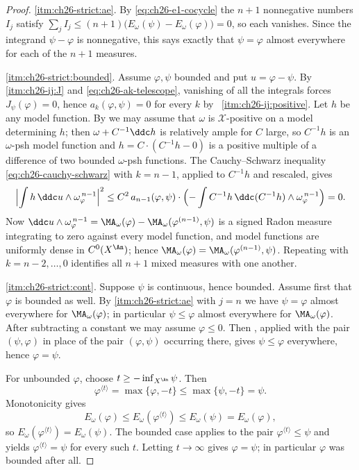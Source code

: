 \begin{proof}
\cref{itm:ch26-strict:ae}.  By \eqref{eq:ch26-e1-cocycle} the \(n+1\)
nonnegative numbers \(I_j\) satisfy
\(\sum_jI_j\leq(n+1)\bigl(E_\omega(\psi)-E_\omega(\varphi)\bigr)=0\), so each
vanishes.  Since the integrand \(\psi-\varphi\) is nonnegative, this says
exactly that \(\psi=\varphi\) almost everywhere for each of the \(n+1\)
measures.

\cref{itm:ch26-strict:bounded}.  Assume \(\varphi,\psi\) bounded and put
\(u=\varphi-\psi\).  By \,%
\cref{itm:ch26-ij:J} and \eqref{eq:ch26-ak-telescope}, vanishing of all the
integrals forces \(J_\psi(\varphi)=0\), hence \(a_k(\varphi,\psi)=0\) for
every \(k\) by \,%
\cref{itm:ch26-ij:positive}.  Let \(h\) be any model function.  By
 we may assume that \(\omega\) is
\(\mathcal X\)-positive on a model determining \(h\); then
\(\omega+C^{-1}\ddc h\) is relatively ample for \(C\) large, so \(C^{-1}h\)
is an \(\omega\)-psh model function and \(h=C\cdot(C^{-1}h-0)\) is a positive
multiple of a difference of two bounded \(\omega\)-psh functions.  The
Cauchy--Schwarz inequality \eqref{eq:ch26-cauchy-schwarz} with \(k=n-1\),
applied to \(C^{-1}h\) and rescaled, gives
\[
 \Bigl|\int h\,\ddc u\wedge\omega_\varphi^{\,n-1}\Bigr|^2
 \leq C^2\,a_{n-1}(\varphi,\psi)\cdot
  \Bigl(-\int C^{-1}h\,\ddc(C^{-1}h)\wedge\omega_\varphi^{\,n-1}\Bigr)=0 .
\]
Now \(\ddc u\wedge\omega_\varphi^{\,n-1}
=\MA_\omega(\varphi)-\MA_\omega(\varphi^{(n-1)},\psi)\) is a signed Radon
measure integrating to zero against every model function, and model functions
are uniformly dense in \(C^0(X^{\An})\); hence
\(\MA_\omega(\varphi)=\MA_\omega(\varphi^{(n-1)},\psi)\).  Repeating with
\(k=n-2,\ldots,0\) identifies all \(n+1\) mixed measures with one another.

\cref{itm:ch26-strict:cont}.  Suppose \(\psi\) is continuous, hence bounded.
Assume first that \(\varphi\) is bounded as well.  By
\cref{itm:ch26-strict:ae} with \(j=n\) we have \(\psi=\varphi\) almost
everywhere for \(\MA_\omega(\varphi)\); in particular
\(\psi\leq\varphi\) almost everywhere for \(\MA_\omega(\varphi)\).  After
subtracting a constant we may assume \(\varphi\leq0\).  Then
, applied with the pair
\((\psi,\varphi)\) in place of the pair \((\varphi,\psi)\) occurring there,
gives \(\psi\leq\varphi\) everywhere, hence \(\varphi=\psi\).

For unbounded \(\varphi\), choose \(t\geq-\inf_{X^{\An}}\psi\).  Then
\[
 \varphi^{\langle t\rangle}=\max\{\varphi,-t\}
 \leq\max\{\psi,-t\}=\psi .
\]
Monotonicity gives
\[
 E_\omega(\varphi)\leq E_\omega(\varphi^{\langle t\rangle})
 \leq E_\omega(\psi)=E_\omega(\varphi),
\]
so \(E_\omega(\varphi^{\langle t\rangle})=E_\omega(\psi)\).  The bounded case
applies to the pair \(\varphi^{\langle t\rangle}\leq\psi\) and yields
\(\varphi^{\langle t\rangle}=\psi\) for every such \(t\).  Letting
\(t\to\infty\) gives \(\varphi=\psi\); in particular \(\varphi\) was bounded
after all.
\end{proof}

